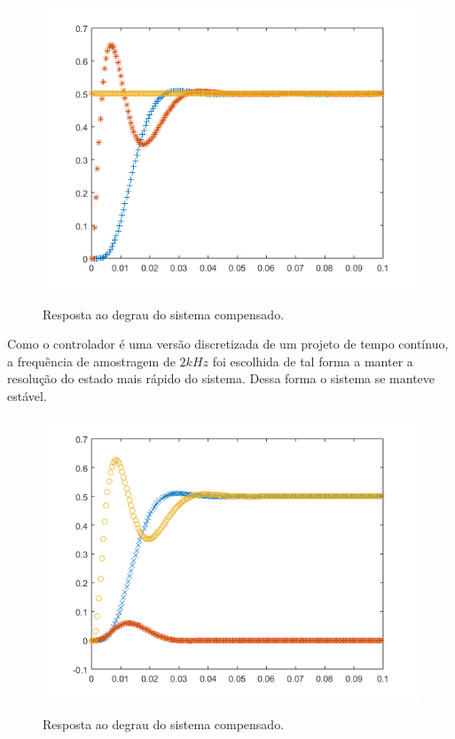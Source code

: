 \documentclass[
	article,			%
	11pt,				%
	oneside,			%
	a4paper,			%
	english,			%
	brazil,				%
	sumario=tradicional
	]{abntex2}
\begin{document}
\begin{figure}[htb!]
	\centering
	\caption{Resposta ao degrau do sistema compensado.}
	\includegraphics[scale=0.65]{./img/resultadoDaEqRecursiva.png}
	\label{fig:resultadoDaEqRecursiva}
\end{figure}

Como o controlador é uma versão discretizada de um projeto de tempo contínuo, a frequência de amostragem de $2 kHz$ foi escolhida de tal forma a manter a resolução do estado mais rápido do sistema. Dessa forma o sistema se manteve estável.

\begin{figure}[htb!]
	\centering
	\caption{Resposta ao degrau do sistema compensado.}
	\includegraphics[scale=0.65]{./img/estadosEamostragem.png}
	\label{fig:estadosEamostragem}
\end{figure}
\end{document}
